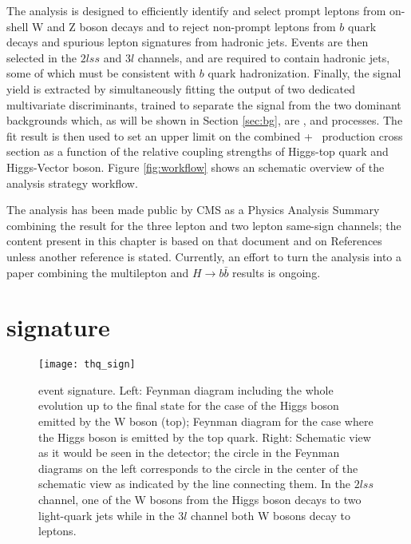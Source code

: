 The analysis is designed to efficiently identify and select prompt leptons from on-shell W and Z boson decays and to reject non-prompt leptons from $b$ quark decays and spurious lepton signatures from hadronic jets. Events are then selected in the $2lss$ and $3l$ channels, and are required to contain hadronic jets, some of which must be consistent with $b$ quark hadronization. Finally, the signal yield is extracted by simultaneously fitting the output of two dedicated multivariate discriminants, trained to separate the \tHq signal from the two dominant backgrounds which, as will be shown in Section \ref{sec:bg},  are \ttbar, \ttW and \ttZ processes. The fit result is then used to set an upper limit on the combined \ttH + \tH\ production cross section as a function of the relative coupling strengths of Higgs-top quark and Higgs-Vector boson. Figure \ref{fig:workflow} shows an schematic overview of the analysis strategy workflow. 

The analysis has been made public by CMS as a Physics Analysis Summary \cite{CMS_PAS_HIG_17-005} combining the result for the three lepton and two lepton same-sign channels; the content present in this chapter is based on that document and on References ~\cite{CMS_AN_2016-211, CMS_AN_2017-029} unless another reference is stated. Currently, an effort to turn the analysis into a paper combining the multilepton and $H \to b\bar{b}$ results is ongoing. 


\section{\tHq signature}\label{sec:thq_sign}

\begin{figure}[!h]
\begin{center}
\texttt{[image: thq\_sign]}
\end{center}
\caption[\tHq event signature]{\tHq event signature. Left: Feynman diagram including the whole evolution up to the final state for the case of the Higgs boson emitted by the W boson (top); Feynman diagram for the case where the Higgs boson is emitted by the top quark. Right: Schematic view as it would be seen in the detector; the circle in the Feynman diagrams on the left corresponds to the circle in the center of the schematic view as indicated by the line connecting them. In the $2lss$ channel, one of the W bosons from the Higgs boson decays to two light-quark jets while in the $3l$ channel both W bosons decay to leptons.}
\label{fig:thq_sign}
\end{figure}

